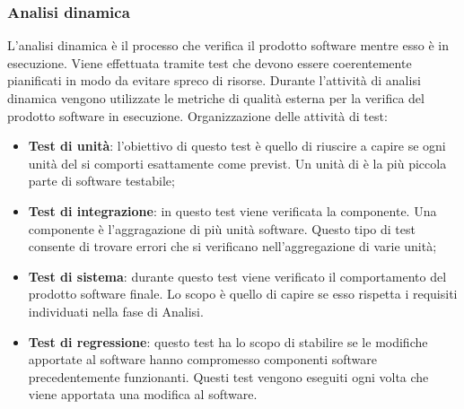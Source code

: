     \subsubsection{Analisi dinamica}
    L'analisi dinamica è il processo che verifica il prodotto software mentre esso è in esecuzione. Viene effettuata tramite test che devono essere coerentemente pianificati in modo da evitare spreco di risorse.
    Durante l'attività di analisi dinamica vengono utilizzate le metriche di qualità esterna per la verifica del prodotto software in esecuzione.
    Organizzazione delle attività di test:
    \begin{itemize}
      \item \textbf{Test di unità}: l'obiettivo di questo test è quello di riuscire a capire se ogni unità del  si comporti esattamente come previst. Un unità di  è la più piccola parte di software testabile;
      \item \textbf{Test di integrazione}: in questo test viene verificata la componente. Una componente è l'aggragazione di più unità software.
      Questo tipo di test consente di trovare errori che si verificano nell'aggregazione di varie unità;
      \item \textbf{Test di sistema}: durante questo test viene verificato il comportamento del prodotto software finale. Lo scopo è quello di capire se esso rispetta i requisiti individuati nella fase di Analisi.
      \item \textbf{Test di regressione}: questo test ha lo scopo di stabilire se le modifiche apportate al software hanno compromesso componenti software precedentemente funzionanti.
      Questi test vengono eseguiti ogni volta che viene apportata una modifica al software.
    \end{itemize}
